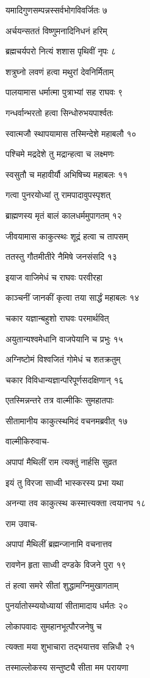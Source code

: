 यमादिगुणसम्पन्नस्सर्वभोगविवर्जितः ७

अर्चयन्सततं विष्णुमनादिनिधनं हरिम्

ब्रह्मचर्यपरो नित्यं शशास पृथिवीं नृपः ८

शत्रुघ्नो लवणं हत्वा मथुरां देवनिर्मिताम्

पालयामास धर्मात्मा पुत्राभ्यां सह राघवः ९

गन्धर्वान्भरतो हत्वा सिन्धोरुभयपार्श्वतः

स्वात्मजौ स्थापयामास तस्मिन्देशे महाबलौ १०

पश्चिमे मद्रदेशे तु मद्रान्हत्वा च लक्ष्मणः

स्वसुतौ च महावीर्यौ अभिषिच्य महाबलः ११

गत्वा पुनरयोध्यां तु रामपादावुपस्पृशत्

ब्राह्मणस्य मृतं बालं कालधर्ममुपागतम् १२

जीवयामास काकुत्स्थः शूद्रं हत्वा च तापसम्

ततस्तु गौतमीतीरे नैमिषे जनसंसदि १३

इयाज वाजिमेधं च राघवः परवीरहा

काञ्चनीं जानकीं कृत्वा तया सार्द्धं महाबलः १४

चकार यज्ञान्बहुशो राघवः परमार्थवित्

अयुतान्यश्वमेधानि वाजपेयानि च प्रभुः १५

अग्निष्टोमं विश्वजितं गोमेधं च शतक्रतुम्

चकार विविधान्यज्ञान्परिपूर्णसदक्षिणान् १६

एतस्मिन्नन्तरे तत्र वाल्मीकिः सुमहातपाः

सीतामानीय काकुत्स्थमिदं वचनमब्रवीत् १७

वाल्मीकिरुवाच-

अपापां मैथिलीं राम त्यक्तुं नार्हसि सुव्रत

इयं तु विरजा साध्वी भास्करस्य प्रभा यथा

अनन्या तव काकुत्स्थ कस्मात्त्यक्ता त्वयानघ १८

राम उवाच-

अपापां मैथिलीं ब्रह्मन्जानामि वचनात्तव

रावणेन हृता साध्वी दण्डके विजने पुरा १९

तं हत्वा समरे सीतां शुद्धामग्निमुखागताम्

पुनर्यातोस्म्ययोध्यायां सीतामादाय धर्मतः २०

लोकापवादः सुमहानभूत्पौरजनेषु च

त्यक्ता मया शुभाचारा तद्भयात्तव सन्निधौ २१

तस्माल्लोकस्य सन्तुष्ट्यै सीता मम परायणा

